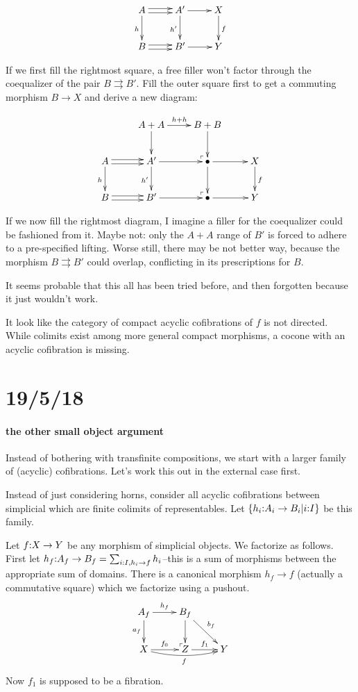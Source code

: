 \documentclass[csh.tex]{subfiles}
\makeatletter
\newcommand\pushout{\ar@{}[dr]|(.9)\ulcorner}
\newcommand\parr{\ar@<.5ex>[r]\ar@<-.5ex>[r]}
\makeatother
\begin{document}
\[\xymatrix{
A\parr\ar[d]_h & A'\ar[r]\ar[d]_{h'} & X\ar[d]^f\\
B\parr & B'\ar[r] & Y
}\]

If we first fill the rightmost square, a free filler won't factor through the coequalizer of the pair $B\rightrightarrows B'$. Fill the outer square first to get a commuting morphism $B\to X$ and derive a new diagram:

\[\xymatrix{
& A+A \ar[r]^{h+h}\ar[d]\pushout & B+B\ar[d] \\
A\parr\ar[d]_h & A' \ar[r]\ar[d]_{h'}\pushout & \bullet \ar[r]\ar[d] & X\ar[d]^f\\
B\parr & B' \ar[r] & \bullet \ar[r] & Y
}\]

If we now fill the rightmost diagram, I imagine a filler for the coequalizer could be fashioned from it. Maybe not: only the $A+A$ range of $B'$ is forced to adhere to a pre-specified lifting. Worse still, there may be not better way, because the morphism $B\rightrightarrows B'$ could overlap, conflicting in its prescriptions for $B$.

It seems probable that this all has been tried before, and then forgotten because it just wouldn't work. 

It look like the category of compact acyclic cofibrations of $f$ is not directed. While colimits exist among more general compact morphisms, a cocone with an acyclic cofibration is missing. 


\section{19/5/18}

\paragraph{the other small object argument}
Instead of bothering with transfinite compositions, we start with a larger family of (acyclic) cofibrations. Let's work this out in the external case first.

Instead of just considering horns, consider all acyclic cofibrations between simplicial which are finite colimits of representables. Let $\left\{h_i\mathord : A_i \to B_i |i\mathord : I\right\}$ be this family.

Let $f\mathord : X\to Y$ be any morphism of simplicial objects. We factorize as follows. First let $h_f\mathord : A_f\to B_f = \sum_{ i\mathord : I, h_i\to f } h_i$--this is a sum of morphisms between the appropriate sum of domains. There is a canonical morphism $h_f\to f$ (actually a commutative square) which we factorize using a pushout.
\[\xymatrix{
A_f\ar[r]^{h_f}\ar[d]_{a_f}\pushout & B_f\ar[d]\ar[dr]^{b_f} \\
X \ar[r]^{f_0}\ar@/_/[rr]_f & Z \ar[r]^{f_1} & Y
}\]
Now $f_1$ is supposed to be a fibration.
\end{document}
